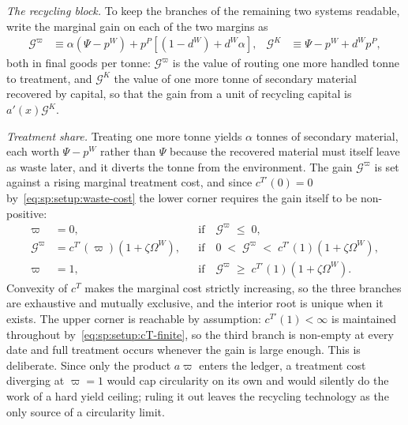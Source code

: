 \emph{The recycling block.} To keep the branches of the remaining two systems readable, write the
marginal gain on each of the two margins as
\begin{align}
\mathcal G^{\varpi} &\equiv \alpha\left(\Psi-p^W\right)+p^P\left[\left(1-d^W\right)+d^W\alpha\right],
&
\mathcal G^{K} &\equiv \Psi-p^W+d^Wp^P,
\label{eq:sp:sum:gains}
\end{align}
both in final goods per tonne: $\mathcal G^\varpi$ is the value of routing one more handled tonne to
treatment, and $\mathcal G^{K}$ the value of one more tonne of secondary material recovered by
capital, so that the gain from a unit of recycling capital is $a'\!\left(x\right)\mathcal G^K$.

\emph{Treatment share.} Treating one more tonne yields $\alpha$ tonnes of secondary material, each
worth $\Psi-p^W$ rather than $\Psi$ because the recovered material must itself leave as waste later,
and it diverts the tonne from the environment. The gain $\mathcal G^\varpi$ is set against a rising
marginal treatment cost, and since $c^{T\prime}\left(0\right)=0$ by~\eqref{eq:sp:setup:waste-cost} the
lower corner requires the gain itself to be non-positive:
\begin{subequations}
\label{eq:sp:sum:varpi}
\begin{align}
\varpi &= 0,
&&\text{if}\quad \mathcal G^{\varpi} \;\le\; 0,
\label{eq:sp:sum:varpi-lower}
\\
\mathcal G^{\varpi} &= c^{T\prime}\left(\varpi\right)\left(1+\zeta\Omega^W\right),
&&\text{if}\quad 0 \;<\; \mathcal G^{\varpi} \;<\; c^{T\prime}\left(1\right)\left(1+\zeta\Omega^W\right),
\label{eq:sp:sum:varpi-interior}
\\
\varpi &= 1,
&&\text{if}\quad \mathcal G^{\varpi} \;\ge\; c^{T\prime}\left(1\right)\left(1+\zeta\Omega^W\right).
\label{eq:sp:sum:varpi-upper}
\end{align}
\end{subequations}
Convexity of $c^T$ makes the marginal cost strictly increasing, so the three branches are exhaustive
and mutually exclusive, and the interior root is unique when it exists. The upper corner is reachable
by assumption: $c^{T\prime}\left(1\right)<\infty$ is maintained throughout
by~\eqref{eq:sp:setup:cT-finite}, so the third branch is non-empty at every date and full treatment
occurs whenever the gain is large enough. This is deliberate. Since only the product $a\varpi$ enters
the ledger, a treatment cost diverging at $\varpi=1$ would cap circularity on its own and would
silently do the work of a hard yield ceiling; ruling it out leaves the recycling technology as the
only source of a circularity limit.

